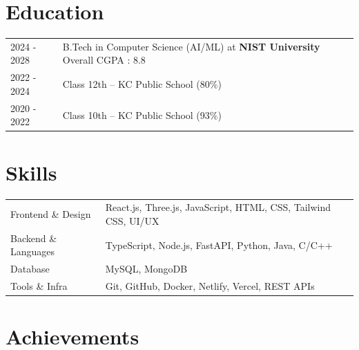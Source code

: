 \documentclass[a4paper,12pt]{article}
\begin{document}

\section{Education}
\begin{tabularx}{\linewidth}{@{}l X@{}}

2024 - 2028 & B.Tech in Computer Science (AI/ML) at \textbf{NIST University} \hfill Overall CGPA : 8.8\\

2022 - 2024 & Class 12th -- KC Public School \hfill (80\%) \\

2020 - 2022 & Class 10th -- KC Public School \hfill (93\%) \\

\end{tabularx}


\section{Skills}
\begin{tabularx}{\linewidth}{@{}l X@{}}

Frontend \& Design & React.js, Three.js, JavaScript, HTML, CSS, Tailwind CSS, UI/UX \\

Backend \& Languages & TypeScript, Node.js, FastAPI, Python, Java, C/C++ \\

Database & MySQL, MongoDB \\

Tools \& Infra & Git, GitHub, Docker, Netlify, Vercel, REST APIs \\

\end{tabularx}


\section{Achievements}
\end{document}
